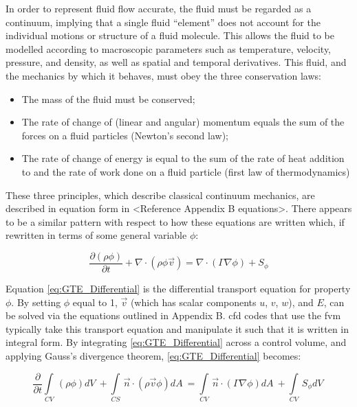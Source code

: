 \documentclass[double,12pt]{beavtex}
\begin{document}
In order to represent fluid flow accurate, the fluid must be regarded as a continuum, implying that a single fluid “element” does not account for the individual motions or structure of a fluid molecule. This allows the fluid to be modelled according to macroscopic parameters such as temperature, velocity, pressure, and density, as well as spatial and temporal derivatives. This fluid, and the mechanics by which it behaves, must obey the three conservation laws:

\begin{itemize}
    \item The mass of the fluid must be conserved;
    \item The rate of change of (linear and angular) momentum equals the sum of the forces on a fluid particles (Newton’s second law);
    \item The rate of change of energy is equal to the sum of the rate of heat addition to and the rate of work done on a fluid particle (first law of thermodynamics)
\end{itemize}

These three principles, which describe classical continuum mechanics, are described in equation form in <Reference Appendix B equations>. There appears to be a similar pattern with respect to how these equations are written which, if rewritten in terms of some general variable $\phi$:

\begin{equation}
    \frac{\partial (\rho \phi)}{\partial t} + \nabla \cdot (\rho \phi \overrightarrow{v}) = \nabla \cdot (\Gamma \nabla \phi) + S_{\phi}
\label{eq:GTE_Differential}
\end{equation}

Equation \ref{eq:GTE_Differential} is the differential transport equation for property $\phi$. By setting $\phi$ equal to 1, $\overrightarrow{v}$ (which has scalar components $u$, $v$, $w$), and $E$, can be solved via the equations outlined in Appendix B. \acrshort{cfd} codes that use the \acrshort{fvm} typically take this transport equation and manipulate it such that it is written in integral form. By integrating \ref{eq:GTE_Differential} across a control volume, and applying Gauss's divergence theorem, \ref{eq:GTE_Differential} becomes:

\begin{equation}
    \frac{\partial}{\partial t} \int\limits_{CV} \, (\rho \phi) dV\ + \int\limits_{CS} \, \overrightarrow{n} \cdot (\rho \overrightarrow{v} \phi) dA\ = \int\limits_{CV} \, \overrightarrow{n} \cdot (\Gamma \nabla \phi) dA\ + \int\limits_{CV} \, S_{\phi} dV\
\label{eq:GTE_Integrated}
\end{equation}
\end{document}
